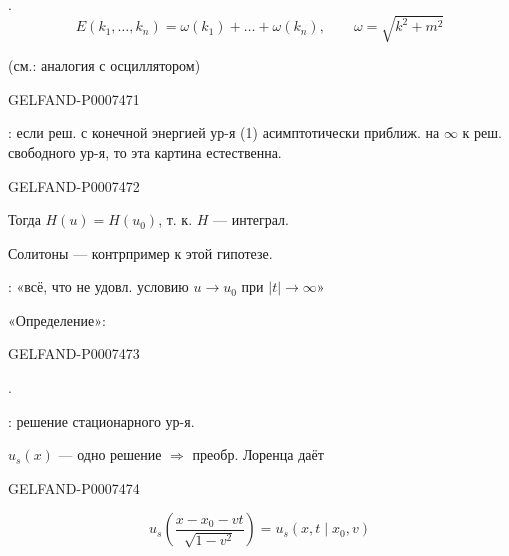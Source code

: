 .
\begin{equation*}
E(k_1,\dots,k_n)=\omega(k_1)+\dots+\omega(k_n),\qquad
\omega=\sqrt{k^2+m^2}
\tag{9}
\end{equation*}

(см.: аналогия с осциллятором)


\begin{GelfandAdjacentEvidence}{GELFAND-P000747}{1}

: если реш. с конечной энергией ур-я (1) асимптотически приближ. на \(\infty\) к реш. свободного ур-я, то эта картина естественна.
\end{GelfandAdjacentEvidence}
\begin{GelfandAdjacentEvidence}{GELFAND-P000747}{2}

Тогда \(H(u)=H(u_0)\), т. к. \(H\) --- интеграл.

Солитоны --- контрпример к этой гипотезе.

: «всё, что не удовл. условию \(u\to u_0\) при \(|t|\to\infty\)»

«Определение»: 
\end{GelfandAdjacentEvidence}
\begin{GelfandAdjacentEvidence}{GELFAND-P000747}{3}

.

: решение стационарного ур-я.

\(u_s(x)\) --- одно решение \(\Rightarrow\) преобр. Лоренца даёт
\end{GelfandAdjacentEvidence}
\begin{GelfandAdjacentEvidence}{GELFAND-P000747}{4}

\begin{equation*}
u_s\left(\frac{x-x_0-vt}{\sqrt{1-v^2}}\right)=u_s(x,t\mid x_0,v)
\tag{10}
\end{equation*}
\end{GelfandAdjacentEvidence}
